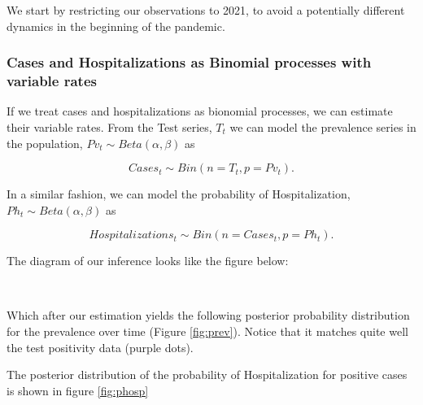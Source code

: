 \documentclass[11pt]{article}
\begin{document}
We start by restricting our observations to 2021, to avoid a potentially different dynamics in the beginning of the pandemic.  

    \hypertarget{cases-and-hospitalizations-as-binomial-processes-with-variable-rates}{%
\subsubsection{Cases and Hospitalizations as Binomial processes with
variable
rates}\label{cases-and-hospitalizations-as-binomial-processes-with-variable-rates}}

If we treat cases and hospitalizations as bionomial processes, we can
estimate their variable rates. From the Test series, \(T_t\) we can
model the prevalence series in the population,
\(Pv_t \sim Beta (\alpha, \beta)\) as

\[Cases_t \sim Bin(n=T_t, p=Pv_t).\]

In a similar fashion, we can model the probability of Hospitalization,
\(Ph_t \sim Beta (\alpha, \beta)\) as

\[Hospitalizations_t \sim Bin(n=Cases_t, p=Ph_t).\]



The diagram of our inference looks like the figure below:
 
            
    
    \begin{center}
    \end{center}
    { \hspace*{\fill} \\}
    

    Which after our estimation yields the following posterior probability distribution
 for the prevalence over time (Figure \ref{fig:prev}). Notice that it matches quite well the test
positivity data (purple dots).

The posterior distribution of the probability of Hospitalization for positive cases is shown in figure \ref{fig:phosp}
\end{document}
